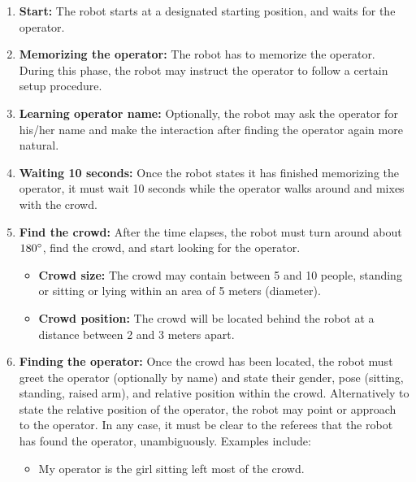 \begin{enumerate}

  \item \textbf{Start:} The robot starts at a designated starting position, and waits for the  operator.

  \item \textbf{Memorizing the operator:} The robot has to memorize the operator.   During this phase, the robot may instruct the operator to follow a certain setup procedure.

  \item \textbf{Learning operator name:} Optionally, the robot may ask the operator for his/her name and make the interaction after finding the operator again more natural.

  \item \textbf{Waiting 10 seconds:} Once the robot states it has finished memorizing the operator, it must wait 10 seconds while the operator walks around and mixes with the crowd.

  \item \textbf{Find the crowd:} After the time elapses, the robot must turn around about $180\degree$, find the crowd, and start looking for the operator.
  \begin{itemize}

    \item \textbf{Crowd size:} The crowd may contain between 5 and 10 people, standing or sitting or lying within an  area of 5 meters (diameter).

    \item \textbf{Crowd position:} The crowd will be located behind the robot at a distance between 2 and 3 meters apart.
  \end{itemize}

  \item \textbf{Finding the operator:} Once the crowd has been located, the robot must greet the operator (optionally by name) and state their gender, pose (sitting, standing, raised arm), and relative position within the crowd.   Alternatively to state the relative position of the operator, the robot may point or approach to the operator. In any case, it must be clear to the referees that the robot has found the operator, unambiguously. Examples include:
  \begin{itemize}

    \item My operator is the girl sitting left most of the crowd.


\end{itemize}
\end{enumerate}
